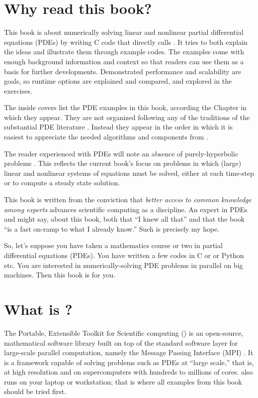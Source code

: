 
\section{Why read this book?}

This book is about numerically solving linear and nonlinear partial differential equations (PDEs) by writing C code \citep{KernighanRitchie1988} that directly calls \PETSc.  It tries to both explain the ideas and illustrate them through example codes.  The examples come with enough background information and context so that readers can use them as a basis for further developments.  Demonstrated performance and scalability are goals, so runtime options are explained and compared, and explored in the exercises.

The inside covers list the PDE examples in this book, according the Chapter in which they appear.  They are not organized following any of the traditions of the substantial PDE literature \citep[for just a start]{Evans2010,Ockendonetal2003}.  Instead they appear in the order in which it is easiest to appreciate the needed algorithms and components from \PETSc.

The reader experienced with PDEs will note an absence of purely-hyperbolic problems \citep[compare][]{LeVeque2002}.  This reflects the current book's focus on problems in which (large) linear and nonlinear systems of equations must be solved, either at each time-step or to compute a steady state solution.

This book is written from the conviction that \emph{better access to common knowledge among experts} advances scientific computing as a discipline.  An expert in PDEs and \PETSc might say, about this book, both that ``I knew all that'' and that the book ``is a fast on-ramp to what I already know.''  Such is precisely my hope.

So, let's suppose you have taken a mathematics course or two in partial differential equations (PDEs).  You have written a few codes in C or \Matlab or Python etc.  You are interested in numerically-solving PDE problems in parallel on big machines.  Then this book is for you.

\section{What is \PETSc?}

The Portable, Extensible Toolkit for Scientific computing (\PETSc) is an open-source, mathematical software library built on top of the standard software layer for large-scale parallel computation, namely the Message Passing Interface (MPI) \citep{Groppetal1999}.  It is a framework capable of solving problems such as PDEs at ``large scale,'' that is, at high resolution and on supercomputers with hundreds to millions of cores.  \PETSc also runs on your laptop or workstation; that is where all examples from this book should be tried first.

